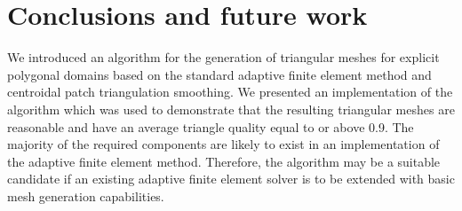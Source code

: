 \documentclass[12pt]{article}
\begin{document}
\section{Conclusions and future work}
\label{sec:org615e973}

We introduced an algorithm for the generation of triangular meshes for explicit
polygonal domains based on the standard adaptive finite element method and
centroidal patch triangulation smoothing.  We presented an implementation of the
algorithm which was used to demonstrate that the resulting triangular meshes are
reasonable and have an average triangle quality equal to or above 0.9.
The majority of the required components are likely to exist in an
implementation of the adaptive finite element method.  Therefore, the algorithm
may be a suitable candidate if an existing adaptive finite element solver is to be
extended with basic mesh generation capabilities.



\end{document}
